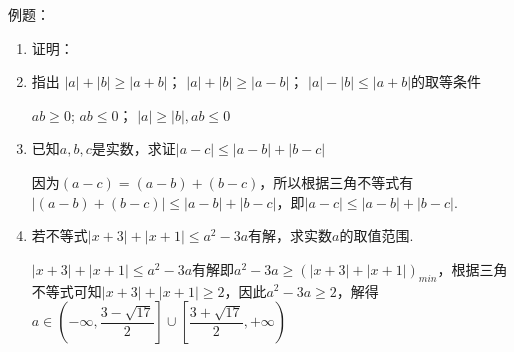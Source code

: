 例题：
\begin{enumerate}
    \item 证明：
    \begin{jieda}
    \end{jieda}
    \item 指出 $|a|+|b| \geq |a+b|$；\quad {} $|a|+ |b| \geq |a-b|$；\quad {} $|a| - |b| \leq |a+b|$的取等条件
    \begin{jieda}
         $ab \geq 0$;  $ab \leq 0$； $|a| \geq |b|, ab \leq 0$
    \end{jieda}
    \item 已知$a, b, c$是实数，求证$|a-c| \leq |a-b| + |b-c|$
    \begin{jieda}
        因为$(a-c) = (a-b) + (b-c)$，所以根据三角不等式有$|(a-b) + (b-c)| \leq |a-b| + |b-c|$，即$|a-c| \leq |a-b| + |b-c|$.
    \end{jieda}
    \item 若不等式$|x+3|+|x+1| \leq a^2-3a$有解，求实数$a$的取值范围.
    \begin{jieda}
        $|x+3|+|x+1| \leq a^2-3a$有解即$a^2-3a \geq (|x+3|+|x+1|)_{min}$，根据三角不等式可知$|x+3|+|x+1| \geq 2$，因此$a^2-3a \geq 2$，解得$a \in \left(-\infty, \dfrac{3 - \sqrt{17}}{2}\right] \cup \left[\dfrac{3 + \sqrt{17}}{2}, +\infty\right)$

\end{jieda}
\end{enumerate}
